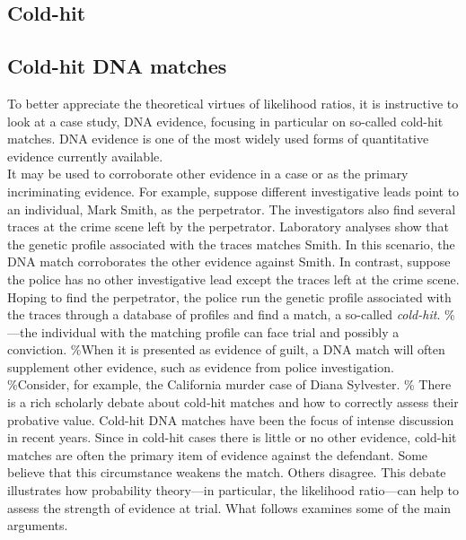 \documentclass[10pt,dvipsnames,enabledeprecatedfontcommands]{scrartcl}
\begin{document}
\subsection{Cold-hit}\label{cold-hit}


\subsection{Cold-hit DNA matches}
 \label{subsec:cold-hit}

To better appreciate the theoretical virtues of likelihood ratios, it is
instructive to look at a case study, DNA evidence, focusing in
particular on so-called cold-hit matches. DNA evidence is one of the
most widely used forms of quantitative evidence currently available.\\
It may be used to corroborate other evidence in a case or as the primary
incriminating evidence. For example, suppose different investigative
leads point to an individual, Mark Smith, as the perpetrator. The
investigators also find several traces at the crime scene left by the
perpetrator. Laboratory analyses show that the genetic profile
associated with the traces matches Smith. In this scenario, the DNA
match corroborates the other evidence against Smith. In contrast,
suppose the police has no other investigative lead except the traces
left at the crime scene. Hoping to find the perpetrator, the police run
the genetic profile associated with the traces through a database of
profiles and find a match, a so-called \textit{cold-hit}. \%---the
individual with the matching profile can face trial and possibly a
conviction. \%When it is presented as evidence of guilt, a DNA match
will often supplement other evidence, such as evidence from police
investigation. \%Consider, for example, the California murder case of
Diana Sylvester. \% There is a rich scholarly debate about cold-hit
matches and how to correctly assess their probative value. Cold-hit DNA
matches have been the focus of intense discussion in recent years. Since
in cold-hit cases there is little or no other evidence, cold-hit matches
are often the primary item of evidence against the defendant. Some
believe that this circumstance weakens the match. Others disagree. This
debate illustrates how probability theory---in particular, the
likelihood ratio---can help to assess the strength of evidence at trial.
What follows examines some of the main arguments.
\end{document}
